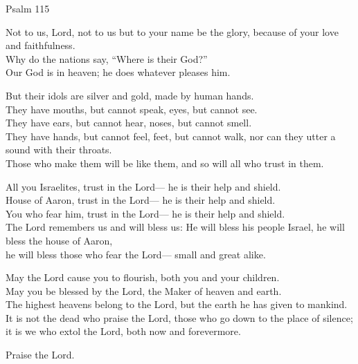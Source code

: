 \begin{bibletext}{Psalm 115}
    \begin{verseframe}
        Not to us, Lord, not to us
        but to your name be the glory,
        because of your love and faithfulness. \\
        Why do the nations say,
        ``Where is their God?'' \\
        Our God is in heaven;
        he does whatever pleases him.
    \end{verseframe}

    \begin{verseframe}
        But their idols are silver and gold,
        made by human hands. \\
        They have mouths, but cannot speak,
        eyes, but cannot see. \\
        They have ears, but cannot hear,
        noses, but cannot smell. \\
        They have hands, but cannot feel,
        feet, but cannot walk,
        nor can they utter a sound with their throats. \\
        Those who make them will be like them,
        and so will all who trust in them. 
    \end{verseframe}

    \begin{verseframe}
        All you Israelites, trust in the Lord---
        he is their help and shield. \\
        House of Aaron, trust in the Lord---
        he is their help and shield. \\
        You who fear him, trust in the Lord---
        he is their help and shield. \\
        The Lord remembers us and will bless us:
        He will bless his people Israel,
        he will bless the house of Aaron, \\
        he will bless those who fear the Lord---
        small and great alike.
    \end{verseframe}

    \begin{verseframe}
        May the Lord cause you to flourish,
        both you and your children.\\
        May you be blessed by the Lord,
        the Maker of heaven and earth. \\
        The highest heavens belong to the Lord,
        but the earth he has given to mankind. \\
        It is not the dead who praise the Lord,
        those who go down to the place of silence; \\
        it is we who extol the Lord,
        both now and forevermore.

        Praise the Lord.
    \end{verseframe}
\end{bibletext}
\endinput
